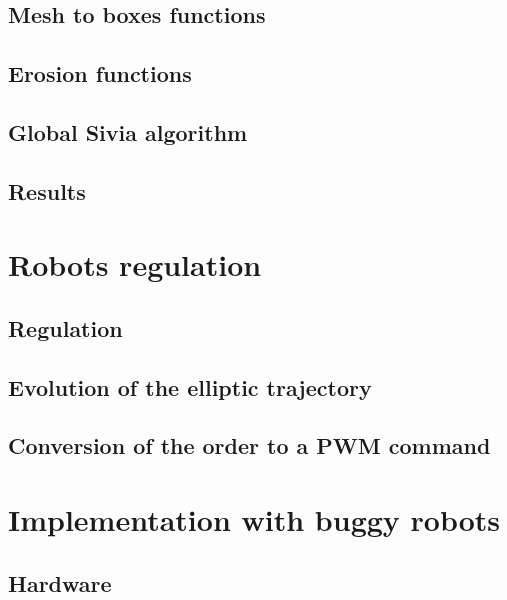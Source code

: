 \documentclass[12pt,fleqn]{report} %
\begin{document}
\section{Mesh to boxes functions}


\section{Erosion functions}


\section{Global Sivia algorithm}


\section{Results}



\chapter{Robots regulation}

\section{Regulation}


\section{Evolution of the elliptic trajectory}


\section{Conversion of the order to a PWM command}



\chapter{Implementation with buggy robots}
\section{Hardware}

\end{document}
